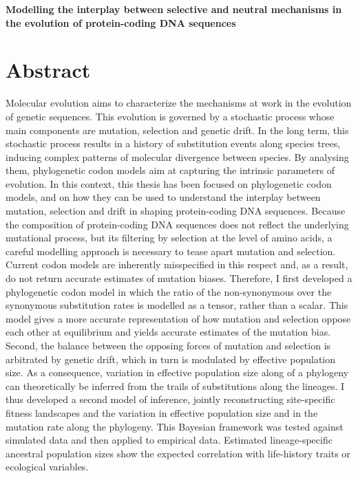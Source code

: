\begin{center}
	\huge
	\textbf{Modelling the interplay between selective and neutral mechanisms in the evolution of protein-coding DNA sequences}
\end{center}

\section*{Abstract}

Molecular evolution aims to characterize the mechanisms at work in the evolution of genetic sequences.
This evolution is governed by a stochastic process whose main components are mutation, selection and genetic drift.
In the long term, this stochastic process results in a history of substitution events along species trees, inducing complex patterns of molecular divergence between species.
By analysing them, phylogenetic codon models aim at capturing the intrinsic parameters of evolution.
In this context, this thesis has been focused on phylogenetic codon models, and on how they can be used to understand the interplay between mutation, selection and drift in shaping protein-coding DNA sequences.
Because the composition of protein-coding DNA sequences does not reflect the underlying mutational process, but its filtering by selection at the level of amino acids, a careful modelling approach is necessary to tease apart mutation and selection.
Current codon models are inherently misspecified in this respect and, as a result, do not return accurate estimates of mutation biases.
Therefore, I first developed a phylogenetic codon model in which the ratio of the non-synonymous over the synonymous substitution rates is modelled as a tensor, rather than a scalar.
This model gives a more accurate representation of how mutation and selection oppose each other at equilibrium and yields accurate estimates of the mutation bias.
Second, the balance between the opposing forces of mutation and selection is arbitrated by genetic drift, which in turn is modulated by effective population size.
As a consequence, variation in effective population size along of a phylogeny can theoretically be inferred from the trails of substitutions along the lineages.
I thus developed a second model of inference, jointly reconstructing site-specific fitness landscapes and the variation in effective population size and in the mutation rate along the phylogeny.
This Bayesian framework was tested against simulated data and then applied to empirical data.
Estimated lineage-specific ancestral population sizes show the expected correlation with life-history traits or ecological variables.
